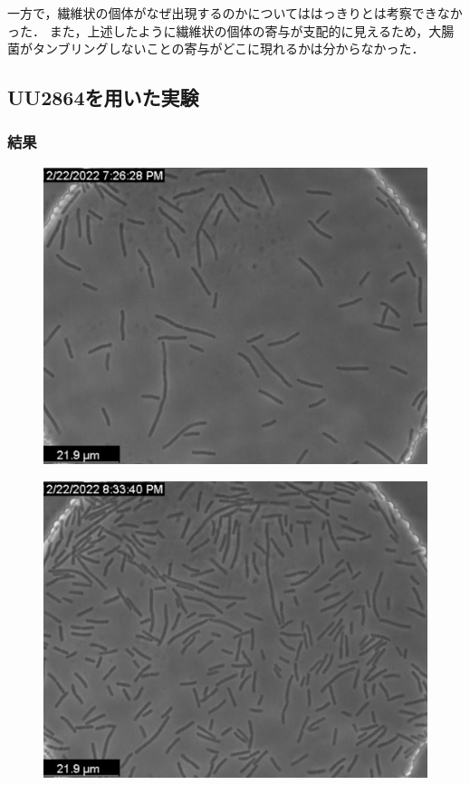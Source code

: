 \documentclass[a4paper,11pt,titlepage]{jsarticle}
\begin{document}
一方で，繊維状の個体がなぜ出現するのかについてははっきりとは考察できなかった．
また，上述したように繊維状の個体の寄与が支配的に見えるため，大腸菌がタンブリングしないことの寄与がどこに現れるかは分からなかった．


\subsection{UU2864を用いた実験}
\subsubsection{結果}

\begin{figure}[htbp]
  \centering
  \begin{minipage}{0.45\linewidth}
    \centering
    \includegraphics[width=\columnwidth]{Series007_t000000_RAW_ch00.pdf}
    \label{fig:64_1}
  \end{minipage}
  \begin{minipage}{0.45\linewidth}
    \centering
    \includegraphics[width=\columnwidth]{Series007_t040000_RAW_ch00.pdf}

\end{minipage}
\end{figure}
\end{document}

